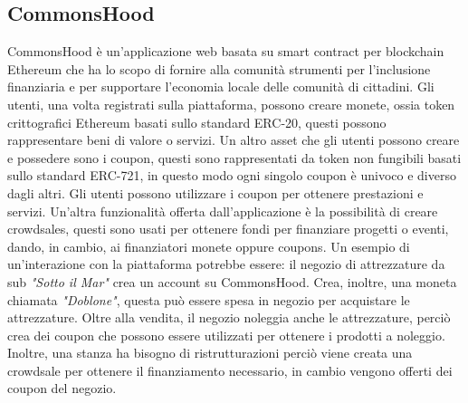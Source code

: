 \documentclass[a4paper]{article}
\begin{document}
    \subsection{CommonsHood}
    CommonsHood è un’applicazione web basata su smart contract per blockchain Ethereum che ha lo scopo di fornire alla comunità strumenti per l’inclusione finanziaria e per supportare l’economia locale delle comunità di cittadini.
    Gli utenti, una volta registrati sulla piattaforma, possono creare monete, ossia token crittografici Ethereum basati sullo standard ERC-20, questi possono rappresentare beni di valore o servizi.
    Un altro asset che gli utenti possono creare e possedere sono i coupon, questi sono rappresentati da token non fungibili basati sullo standard ERC-721, in questo modo ogni singolo coupon è univoco e diverso dagli altri.
    Gli utenti possono utilizzare i coupon per ottenere prestazioni e servizi.
    \newline
    Un'altra funzionalità offerta dall'applicazione è la possibilità di creare crowdsales, questi sono usati per ottenere fondi per finanziare progetti o eventi, dando, in cambio, ai finanziatori monete oppure coupons.
    Un esempio di un'interazione con la piattaforma potrebbe essere: il negozio di attrezzature da sub \emph{"Sotto il Mar"} crea un account su CommonsHood. Crea, inoltre, una moneta chiamata \emph{"Doblone"}, questa può essere spesa in negozio
    per acquistare le attrezzature. Oltre alla vendita, il negozio noleggia anche le attrezzature, perciò crea dei coupon che possono essere utilizzati per ottenere i prodotti a noleggio.
    Inoltre, una stanza ha bisogno di ristrutturazioni perciò viene creata una crowdsale per ottenere il finanziamento necessario, in cambio vengono offerti dei coupon del negozio.
    
\end{document}
